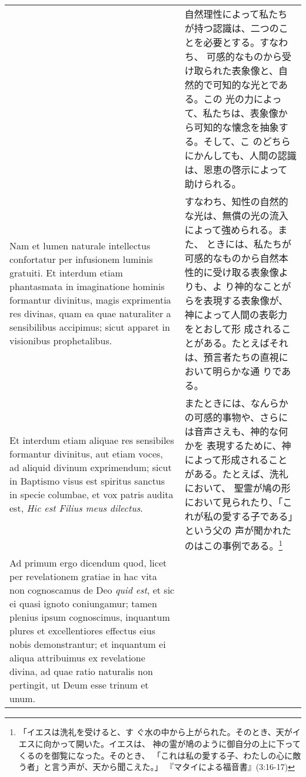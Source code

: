 \documentclass[10pt]{jsarticle} %
\begin{document}
\begin{longtable}{p{21em}p{21em}}
&

自然理性によって私たちが持つ認識は、二つのことを必要とする。すなわち、
可感的なものから受け取られた表象像と、自然的で可知的な光とである。この
光の力によって、私たちは、表象像から可知的な懐念を抽象する。そして、こ
のどちらにかんしても、人間の認識は、恩恵の啓示によって助けられる。

\\

Nam et lumen naturale intellectus confortatur per infusionem luminis
gratuiti. Et interdum etiam phantasmata in imaginatione hominis
formantur divinitus, magis exprimentia res divinas, quam ea quae
naturaliter a sensibilibus accipimus; sicut apparet in visionibus
prophetalibus.

&

すなわち、知性の自然的な光は、無償の光の流入によって強められる。また、
ときには、私たちが可感的なものから自然本性的に受け取る表象像よりも、よ
り神的なことがらを表現する表象像が、神によって人間の表彰力をとおして形
成されることがある。たとえばそれは、預言者たちの直視において明らかな通
りである。

\\

Et interdum etiam aliquae res sensibiles formantur divinitus, aut
etiam voces, ad aliquid divinum exprimendum; sicut in Baptismo visus
est spiritus sanctus in specie columbae, et vox patris audita est,
{\it Hic est Filius meus dilectus}.

&

またときには、なんらかの可感的事物や、さらには音声さえも、神的な何かを
表現するために、神によって形成されることがある。たとえば、洗礼において、
聖霊が鳩の形において見られたり、「これが私の愛する子である」という父の
声が聞かれたのはこの事例である。\footnote{「イエスは洗礼を受けると、す
ぐ水の中から上がられた。そのとき、天がイエスに向かって開いた。イエスは、
神の霊が鳩のように御自分の上に下ってくるのを御覧になった。そのとき、
「これは私の愛する子、わたしの心に敵う者」と言う声が、天から聞こえた。」
『マタイによる福音書』(3:16-17)}

\\

{\sc Ad primum ergo dicendum} quod, licet per revelationem gratiae in
hac vita non cognoscamus de Deo {\it quid est}, et sic ei quasi ignoto
coniungamur; tamen plenius ipsum cognoscimus, inquantum plures et
excellentiores effectus eius nobis demonstrantur; et inquantum ei
aliqua attribuimus ex revelatione divina, ad quae ratio naturalis non
pertingit, ut Deum esse trinum et unum.


\end{longtable}
\end{document}
